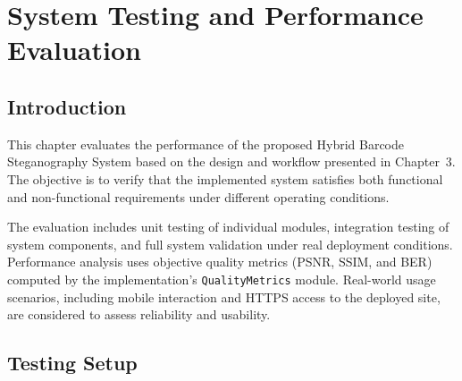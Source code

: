 %
%

\chapter{System Testing and Performance Evaluation}

\section{Introduction}

This chapter evaluates the performance of the proposed Hybrid Barcode Steganography System based on the design and workflow presented in Chapter~3. The objective is to verify that the implemented system satisfies both functional and non-functional requirements under different operating conditions.

The evaluation includes unit testing of individual modules, integration testing of system components, and full system validation under real deployment conditions. Performance analysis uses objective quality metrics (PSNR, SSIM, and BER) computed by the implementation's \texttt{QualityMetrics} module. Real-world usage scenarios, including mobile interaction and HTTPS access to the deployed site, are considered to assess reliability and usability.

\section{Testing Setup}

